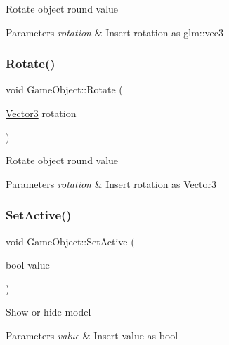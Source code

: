 Rotate object round value 
\begin{DoxyParams}{Parameters}
{\em rotation} & Insert rotation as glm\+::vec3 \\
\hline
\end{DoxyParams}
\mbox{\label{class_game_object_a93d2bb0c555fe8bb6323f9a4827f7a46}} 
\subsubsection{\texorpdfstring{Rotate()}{Rotate()}\hspace{0.1cm}{\footnotesize\ttfamily [2/2]}}
{\footnotesize\ttfamily void Game\+Object\+::\+Rotate (\begin{DoxyParamCaption}\item[{\mbox{\hyperlink{struct_vector3}{Vector3}}}]{rotation }\end{DoxyParamCaption})}

Rotate object round value 
\begin{DoxyParams}{Parameters}
{\em rotation} & Insert rotation as \mbox{\hyperlink{struct_vector3}{Vector3}} \\
\hline
\end{DoxyParams}
\mbox{\label{class_game_object_af1658a9e25a85058f801211dde34281c}} 
\subsubsection{\texorpdfstring{SetActive()}{SetActive()}}
{\footnotesize\ttfamily void Game\+Object\+::\+Set\+Active (\begin{DoxyParamCaption}\item[{bool}]{value }\end{DoxyParamCaption})}

Show or hide model 
\begin{DoxyParams}{Parameters}
{\em value} & Insert value as bool \\
\hline
\end{DoxyParams}
\mbox{\label{class_game_object_af2dfbb6e1219c9483d549beb8f60f81b}} 
